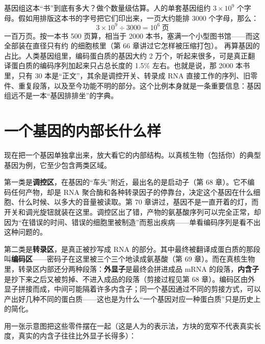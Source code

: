 \begin{qiaoliang}
基因组这本“书”到底有多大？做个数量级估算。人的单套基因组约 $3\times 10^{9}$ 个字母。假如用排版这本书的字号把它们印出来，一页大约能排 3000 个字母，那么：
\[3\times 10^{9} \div 3000 = 10^{6}\ \text{页}\]
一百万页。按一本书 500 页算，相当于 2000 本书，塞满一个小型图书馆——而这全部装在直径只有约  的细胞核里（第 66 章讲过它怎样被压缩打包）。
再算基因的占比。人类基因组里，编码蛋白质的基因大约 2 万个，听起来很多，可是真正翻译蛋白质的编码序列加起来只占总长度的 1.5\% 左右。也就是说，那 2000 本书里，只有 30 本是“正文”，其余是调控开关、转录成 RNA 直接工作的序列、旧零件、重复段落，以及至今功能不明的部分。这个比例本身就是一条重要信息：基因组远不是一本“基因排排坐”的字典。
\end{qiaoliang}

\section{一个基因的内部长什么样}

现在把一个基因单独拿出来，放大看它的内部结构。以真核生物（包括你）的典型基因为例，它至少包含两类区域。

第一类是\textbf{调控区}，在基因的“车头”附近，最出名的是启动子（第 68 章）。它不编码任何产物，却是 RNA 聚合酶和各种转录因子的停靠台，决定这个基因在什么细胞、什么时候、以多大的音量被读取。第 70 章讲过，基因不是一直开着的灯，而开关和调光旋钮就装在这里。调控区出了错，产物的氨基酸序列可以完全正常，却因为“在错误的时间、错误的细胞里被制造”而惹出疾病——单看编码序列是看不出这种问题的。

第二类是\textbf{转录区}，是真正被抄写成 RNA 的部分。其中最终被翻译成蛋白质的那段叫\textbf{编码区}——密码子在这里被三个三个地读成氨基酸（第 69 章）。而在真核生物里，转录区内部还分两种段落：\textbf{外显子}是最终会拼进成品 mRNA 的段落，\textbf{内含子}是抄下来之后又被剪掉、不进入成品的段落（剪接过程见第 68 章）。编码区由外显子拼接而成，中间可能隔着许多内含子；同一个基因通过不同的剪接方式，可以产出好几种不同的蛋白质——这也是为什么“一个基因对应一种蛋白质”只是历史上的简化。

用一张示意图把这些零件摆在一起（这是人为的表示法，方块的宽窄不代表真实长度，真实的内含子往往比外显子长得多）：

\begin{center}
\end{center}

